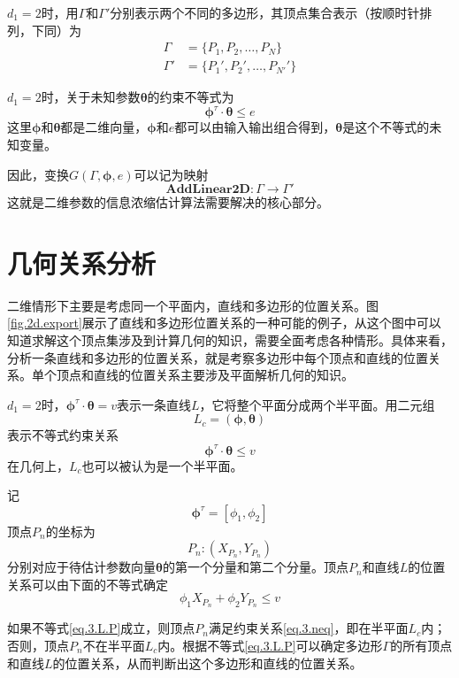 $d_{1}=2$时，用$\Gamma$和$\Gamma'$分别表示两个不同的多边形，其顶点集合表示（按顺时针排列，下同）为
\begin{equation*}%
\begin{split}%
\Gamma&=\{P_{1},P_{2},\ldots,P_{N}\}\\
\Gamma'&=\{P_{1}',P_{2}',\ldots,P_{N'}'\}
\end{split}
\end{equation*}

$d_{1}=2$时，关于未知参数$\bm{\theta}$的约束不等式为
\begin{equation}\label{eq.3.L}
\bm{\phi}^{\tau}\cdot\bm{\theta}\leq e
\end{equation}
这里$\bm{\phi}$和$\bm{\theta}$都是二维向量，$\bm{\phi}$和$e$都可以由输入输出组合得到，$\bm{\theta}$是这个不等式的未知变量。

因此，变换$G(\Gamma,\bm{\phi},e)$可以记为映射
\begin{equation}%
\mathbf{AddLinear2D}\colon \Gamma\rightarrow\Gamma'
\end{equation}
这就是二维参数的信息浓缩估计算法需要解决的核心部分。

\section{几何关系分析}\label{sect:3.2}
二维情形下主要是考虑同一个平面内，直线和多边形的位置关系。图\ref{fig.2d.export}展示了直线和多边形位置关系的一种可能的例子，从这个图中可以知道求解这个顶点集涉及到计算几何的知识，需要全面考虑各种情形。具体来看，分析一条直线和多边形的位置关系，就是考察多边形中每个顶点和直线的位置关系。单个顶点和直线的位置关系主要涉及平面解析几何的知识。

$d_{1}=2$时，$\bm{\phi}^{\tau}\cdot\bm{\theta}=v$表示一条直线$L$，它将整个平面分成两个半平面。用二元组
$$L_{c}=(\bm{\phi},\bm{\theta})$$
表示不等式约束关系
\begin{equation}\label{eq.3.neq}
\bm{\phi}^{\tau}\cdot\bm{\theta}\leq v
\end{equation}
在几何上，$L_{c}$也可以被认为是一个半平面。

记
$$\bm{\phi}^{\tau}=[\phi_{1},\phi_{2}]$$
顶点$P_{n}$的坐标为
$$P_{n}\colon (X_{P_{n}},Y_{P_{n}})$$
分别对应于待估计参数向量$\bm{\theta}$的第一个分量和第二个分量。顶点$P_{n}$和直线$L$的位置关系可以由下面的不等式确定
\begin{equation}\label{eq.3.L.P}
\phi_{1}X_{P_{n}}+\phi_{2}Y_{P_{n}}\leq v
\end{equation}

如果不等式\eqref{eq.3.L.P}成立，则顶点$P_{n}$满足约束关系\eqref{eq.3.neq}，即在半平面$L_{c}$内；否则，顶点$P_{n}$不在半平面$L_{c}$内。根据不等式\eqref{eq.3.L.P}可以确定多边形$\Gamma$的所有顶点和直线$L$的位置关系，从而判断出这个多边形和直线的位置关系。

